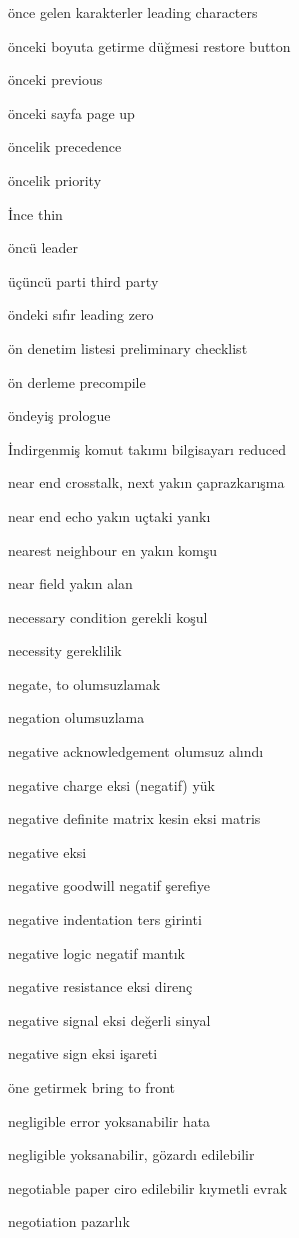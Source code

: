 \documentclass[12pt,fleqn]{article}\usepackage{../../common}
\begin{document}
önce gelen karakterler leading characters

önceki boyuta getirme düğmesi restore button

önceki previous

önceki sayfa page up

öncelik precedence

öncelik priority

İnce thin

öncü leader

üçüncü parti third party

öndeki sıfır leading zero

ön denetim listesi preliminary checklist

ön derleme precompile

öndeyiş prologue

İndirgenmiş komut takımı bilgisayarı reduced

near end crosstalk, next yakın çaprazkarışma

near end echo yakın uçtaki yankı

nearest neighbour en yakın komşu

near field yakın alan

necessary condition gerekli koşul

necessity gereklilik

negate, to olumsuzlamak

negation olumsuzlama

negative acknowledgement olumsuz alındı

negative charge eksi (negatif) yük

negative definite matrix kesin eksi matris

negative eksi

negative goodwill negatif şerefiye

negative indentation ters girinti

negative logic negatif mantık

negative resistance eksi direnç

negative signal eksi değerli sinyal

negative sign eksi işareti

öne getirmek bring to front

negligible error yoksanabilir hata

negligible yoksanabilir, gözardı edilebilir

negotiable paper ciro edilebilir kıymetli evrak

negotiation pazarlık
\end{document}
